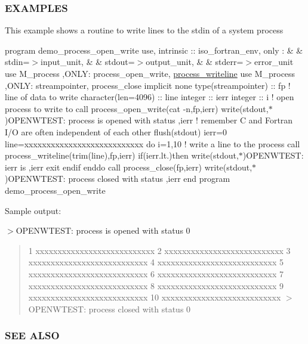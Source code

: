 \subsubsection*{E\+X\+A\+M\+P\+L\+ES}

This example shows a routine to write lines to the stdin of a system process

program demo\+\_\+process\+\_\+open\+\_\+write use, intrinsic \+:\+: iso\+\_\+fortran\+\_\+env, only \+: \& \& stdin=$>$input\+\_\+unit, \& \& stdout=$>$output\+\_\+unit, \& \& stderr=$>$error\+\_\+unit use M\+\_\+process ,O\+N\+LY\+: process\+\_\+open\+\_\+write, \mbox{\hyperlink{interfacem__process_1_1process__writeline}{process\+\_\+writeline}} use M\+\_\+process ,O\+N\+LY\+: streampointer, process\+\_\+close implicit none type(streampointer) \+:\+: fp ! line of data to write character(len=4096) \+:\+: line integer \+:\+: ierr integer \+:\+: i ! open process to write to call process\+\_\+open\+\_\+write(\textquotesingle{}cat -\/n\textquotesingle{},fp,ierr) write(stdout,$\ast$)\textquotesingle{}O\+P\+E\+N\+W\+T\+E\+ST\+: process is opened with status \textquotesingle{},ierr ! remember C and Fortran I/O are often independent of each other flush(stdout) ierr=0 line=\textquotesingle{}xxxxxxxxxxxxxxxxxxxxxxxxxxx\textquotesingle{} do i=1,10 ! write a line to the process call process\+\_\+writeline(trim(line),fp,ierr) if(ierr.\+lt.)then write(stdout,$\ast$)\textquotesingle{}O\+P\+E\+N\+W\+T\+E\+ST\+: ierr is \textquotesingle{},ierr exit endif enddo call process\+\_\+close(fp,ierr) write(stdout,$\ast$)\textquotesingle{}O\+P\+E\+N\+W\+T\+E\+ST\+: process closed with status \textquotesingle{},ierr end program demo\+\_\+process\+\_\+open\+\_\+write

Sample output\+:

$>$O\+P\+E\+N\+W\+T\+E\+ST\+: process is opened with status 0 \begin{quote}
1 xxxxxxxxxxxxxxxxxxxxxxxxxxx 2 xxxxxxxxxxxxxxxxxxxxxxxxxxx 3 xxxxxxxxxxxxxxxxxxxxxxxxxxx 4 xxxxxxxxxxxxxxxxxxxxxxxxxxx 5 xxxxxxxxxxxxxxxxxxxxxxxxxxx 6 xxxxxxxxxxxxxxxxxxxxxxxxxxx 7 xxxxxxxxxxxxxxxxxxxxxxxxxxx 8 xxxxxxxxxxxxxxxxxxxxxxxxxxx 9 xxxxxxxxxxxxxxxxxxxxxxxxxxx 10 xxxxxxxxxxxxxxxxxxxxxxxxxxx $>$O\+P\+E\+N\+W\+T\+E\+ST\+: process closed with status 0 \end{quote}


\subsubsection*{S\+EE A\+L\+SO}

